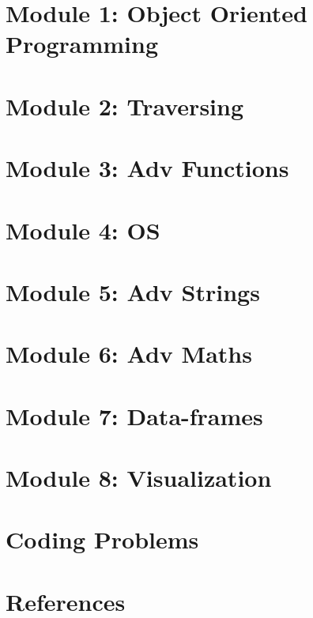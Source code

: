 \section[OOP]{Module 1: Object Oriented Programming}

 
\section[Trav]{Module 2: Traversing}


 
\section[Func]{Module 3: Adv Functions}


 
\section[OS]{Module 4: OS}



\section[Str]{Module 5: Adv Strings}



\section[Maths]{Module 6: Adv Maths}



\section[Data]{Module 7: Data-frames}




\section[Viz]{Module 8: Visualization}



\section[Probs]{Coding Problems}



\section[Refs]{References}



